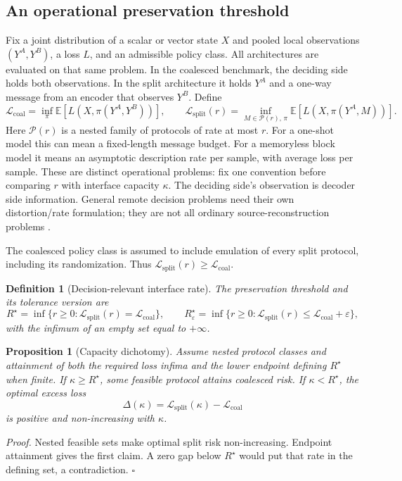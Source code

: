 \documentclass[11pt]{article}
\newtheorem{proposition}{Proposition}
\newtheorem{definition}{Definition}
\newcommand{\E}{\mathbb{E}}
\begin{document}
\subsection{An operational preservation threshold}

Fix a joint distribution of a scalar or vector state $X$ and pooled local
observations $(Y^A,Y^B)$, a loss $L$, and an admissible policy class. All
architectures are evaluated on that same problem. In the coalesced benchmark,
the deciding side holds both observations. In the split architecture it holds
$Y^A$ and a one-way message from an encoder that observes $Y^B$. Define
\[
\mathcal L_{\mathrm{coal}}
=\inf_\pi\E[L(X,\pi(Y^A,Y^B))],\qquad
\mathcal L_{\mathrm{split}}(r)
=\inf_{M\in\mathcal P(r),\,\pi}\E[L(X,\pi(Y^A,M))].
\]
Here $\mathcal P(r)$ is a nested family of protocols of rate at most $r$.
For a one-shot model this can mean a fixed-length message budget. For a
memoryless block model it means an asymptotic description rate per sample,
with average loss per sample. These are distinct operational problems: fix
one convention before comparing $r$ with interface capacity $\kappa$.
The deciding side's observation is decoder side information. General remote
decision problems need their own distortion/rate formulation; they are not
all ordinary source-reconstruction problems \cite{wynerziv1976}.

The coalesced policy class is assumed to include emulation of every split
protocol, including its randomization. Thus
$\mathcal L_{\mathrm{split}}(r)\geq\mathcal L_{\mathrm{coal}}$.

\begin{definition}[Decision-relevant interface rate]
\label{def:rstar}
The preservation threshold and its tolerance version are
\[
R^\star=\inf\{r\geq0:\mathcal L_{\mathrm{split}}(r)
=\mathcal L_{\mathrm{coal}}\},\qquad
R^\star_\varepsilon=\inf\{r\geq0:\mathcal L_{\mathrm{split}}(r)
\leq\mathcal L_{\mathrm{coal}}+\varepsilon\},
\]
with the infimum of an empty set equal to $+\infty$.
\end{definition}

\begin{proposition}[Capacity dichotomy]
\label{prop:capacity}
Assume nested protocol classes and attainment of both the required loss
infima and the lower endpoint defining $R^\star$ when finite. If
$\kappa\geq R^\star$, some feasible protocol attains coalesced risk.
If $\kappa<R^\star$, the optimal excess loss
\[
\Delta(\kappa)=\mathcal L_{\mathrm{split}}(\kappa)
-\mathcal L_{\mathrm{coal}}
\]
is positive and non-increasing with $\kappa$.
\end{proposition}
\noindent\textit{Proof.} Nested feasible sets make optimal split risk
non-increasing. Endpoint attainment gives the first claim. A zero gap below
$R^\star$ would put that rate in the defining set, a contradiction.
\hfill$\square$
\end{document}
